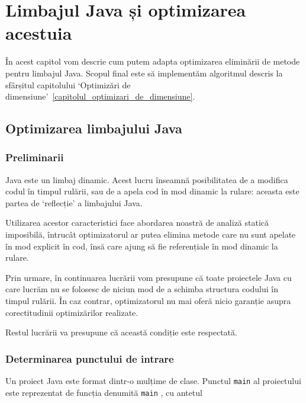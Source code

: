 \chapter{Limbajul Java și optimizarea acestuia}

În acest capitol vom descrie cum putem adapta optimizarea eliminării de metode pentru limbajul Java.
Scopul final este să implementăm algoritmul descris la sfârșitul capitolului `Optimizări de dimensiune'~\ref{capitolul_optimizari_de_dimensiune}.

\section{Optimizarea limbajului Java}


\subsection{Preliminarii}

Java este un limbaj dinamic. Acest lucru înseamnă posibilitatea de a modifica
codul în timpul rulării, sau de a apela cod în mod dinamic la rulare: aceasta
este partea de `reflecție' a limbajului Java.

Utilizarea acestor caracteristici face abordarea noastră de analiză
statică imposibilă, întrucât optimizatorul ar putea elimina metode care nu sunt
apelate în mod explicit în cod, însă care ajung să fie referențiale în mod
dinamic la rulare.

Prin urmare, în continuarea lucrării vom presupune că toate proiectele Java cu
care lucrăm nu se folosesc de niciun mod de a schimba structura codului în
timpul rulării. În caz contrar, optimizatorul nu mai oferă nicio garanție asupra
corectitudinii optimizărilor realizate.

Restul lucrării va presupune că această condiție este respectată.

\subsection{Determinarea punctului de intrare}

Un proiect Java este format dintr-o mulțime de clase.
Punctul \texttt{main} al proiectului este reprezentat de funcția
denumită \texttt{main} \cite{java_main}, cu antetul

